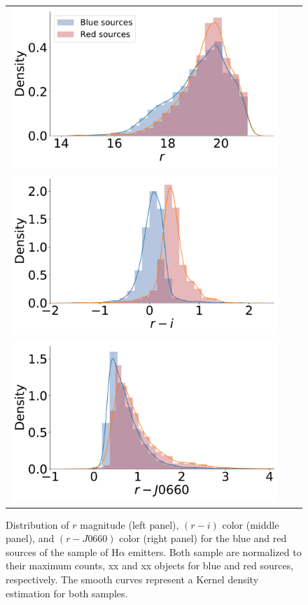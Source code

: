 \documentclass[fleqn,usenatbib]{mnras}
\begin{document}
\begin{figure}
  \begin{tabular}{l l l}
  \includegraphics[width=\columnwidth]{Figs/distribution_r-group.pdf} \\
    \includegraphics[width=\columnwidth]{Figs/distribution-ri-group.pdf}\\
    \includegraphics[width=\columnwidth]{Figs/distribution-Halpha-group.pdf}
  \end{tabular}
  \caption{Distribution of $r$ magnitude  (left panel), $(r - i)$ color (middle panel), and $(r - J0660)$
    color (right panel) for the blue and red sources of the sample of H$\alpha$ emitters.
    Both sample are normalized to their maximum counts, xx and xx objects for blue and
    red sources, respectively. The smooth curves represent a Kernel density estimation for both samples.}
    \label{fig:diagram-distri}
\end{figure}
\end{document}
